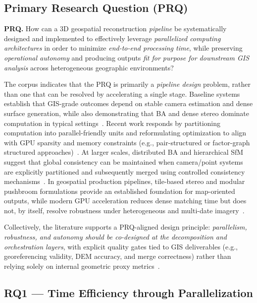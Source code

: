\subsection{Primary Research Question (PRQ)}

\textbf{PRQ.} How can a 3D geospatial reconstruction \emph{pipeline} be systematically designed and implemented to effectively leverage \emph{parallelized computing architectures} in order to minimize \emph{end-to-end processing time}, while preserving \emph{operational autonomy} and producing outputs \emph{fit for purpose for downstream GIS analysis} across heterogeneous geographic environments?

The corpus indicates that the PRQ is primarily a \emph{pipeline design} problem, rather than one that can be resolved by accelerating a single stage. Baseline systems establish that GIS-grade outcomes depend on stable camera estimation and dense surface generation, while also demonstrating that BA and dense stereo dominate computation in typical settings~\cite{Schonberger2016,Schonberger2016MVS,Galliani2015}. Recent work responds by partitioning computation into parallel-friendly units and reformulating optimization to align with GPU sparsity and memory constraints (e.g., pair-structured or factor-graph structured approaches)~\cite{Li2025FastMap,Zhong2025InstantSfM,Yu2025CuSfM,Gopinath2025}. At larger scales, distributed BA and hierarchical SfM suggest that global consistency can be maintained when camera/point systems are explicitly partitioned and subsequently merged using controlled consistency mechanisms~\cite{Zheng2023,Li2025BALM,Zhou2026}. In geospatial production pipelines, tile-based stereo and modular pushbroom formulations provide an established foundation for map-oriented outputs, while modern GPU acceleration reduces dense matching time but does not, by itself, resolve robustness under heterogeneous and multi-date imagery~\cite{deFranchis2014,Amadei2025,Masquil2026}.

Collectively, the literature supports a PRQ-aligned design principle: \emph{parallelism, robustness, and autonomy should be co-designed at the decomposition and orchestration layers}, with explicit quality gates tied to GIS deliverables (e.g., georeferencing validity, DEM accuracy, and merge correctness) rather than relying solely on internal geometric proxy metrics~\cite{Elias2025}.

\subsection{RQ1 --- Time Efficiency through Parallelization}

